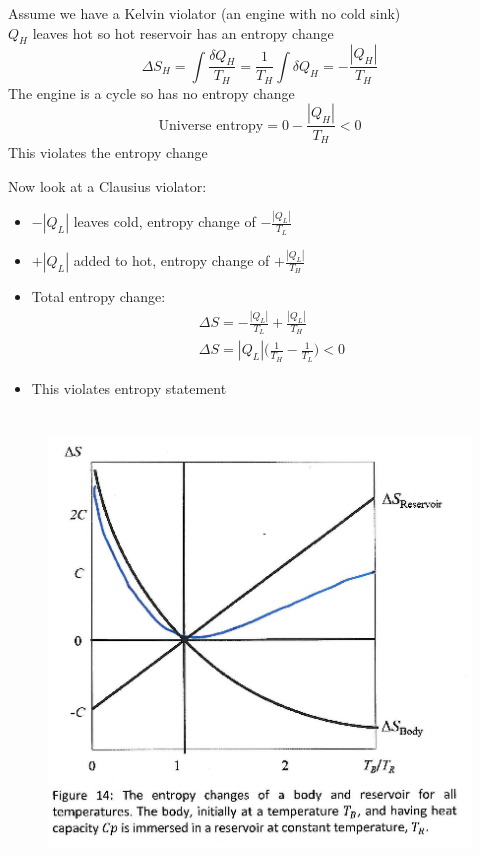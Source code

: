 \documentclass[a4paper, 11pt, normalem]{report}
\begin{document}
Assume we have a Kelvin violator (an engine with no cold sink) \\
$Q_H$ leaves hot so hot reservoir has an entropy change
\begin{equation*}
    \Delta S_H = \int \frac{\delta Q_H}{T_H} = \frac{1}{T_H}\int \delta Q_H = -\frac{|Q_{H}|}{T_H}
\end{equation*}
The engine is a cycle so has no entropy change
\begin{equation*}
    \text{Universe entropy} = 0 - \frac{|Q_{H}|}{T_H} < 0
\end{equation*}
This violates the entropy change

Now look at a Clausius violator:
\begin{itemize}
    \item $-|Q_L|$ leaves cold, entropy change of $-\frac{|Q_L|}{T_L}$
    \item $+|Q_L|$ added to hot, entropy change of $+\frac{|Q_{L}|}{T_H}$
    \item Total entropy change:
            \begin{gather*}
                \Delta S = -\frac{|Q_L|}{T_L} + \frac{|Q_{L}|}{T_H} \\
                \Delta S = |Q_L|\Big(\frac{1}{T_H} - \frac{1}{T_L} \Big) < 0
            \end{gather*}
    \item This violates entropy statement
\end{itemize}

\chapter{}
\begin{figure}
    \begin{center}
        \includegraphics[scale=0.4]{Entropy.png}
        \vspace{-40pt}
    \end{center}
\end{figure}
\end{document}
